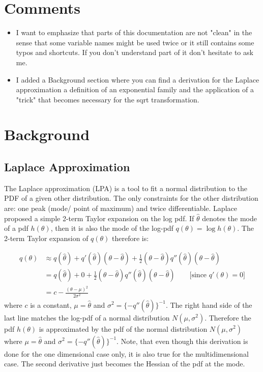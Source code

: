 \documentclass{article}
\author{%
  Marius Hobbhahn \\
  Department of Computer Science\\
  University of Tübingen\\
  Tübingen, Germany \\
  \texttt{marius.hobbhahn@gmail.com} \\
}
\begin{document}
\section*{Comments}

\begin{itemize}
	\item I want to emphasize that parts of this documentation are not "clean" in the sense that some variable names might be used twice or it still contains some typos and shortcuts. If you don't understand part of it don't hesitate to ask me. 
	\item I added a Background section where you can find a derivation for the Laplace approximation a definition of an exponential family and the application of a "trick" that becomes necessary for the sqrt transformation.
\end{itemize}

\section*{Background}

\subsection{Laplace Approximation}

The Laplace approximation (LPA) is a tool to fit a normal distribution to the PDF of a given other distribution. The only constraints for the other distribution are: one peak (mode/ point of maximum) and twice differentiable. Laplace proposed a simple 2-term Taylor expansion on the log pdf. If $\hat{\theta}$ denotes the mode of a pdf $h(\theta)$, then it is also the mode of the log-pdf $q(\theta) = \log h(\theta)$. The 2-term Taylor expansion of $q(\theta)$ therefore is:

\begin{align}
q(\theta) &\approx q(\hat{\theta}) + q'(\hat{\theta})(\theta - \hat{\theta}) + \frac{1}{2}(\theta- \hat{\theta})q''(\hat{\theta}) (\theta - \hat{\theta})\\
&= 	q(\hat{\theta}) + 0 +  \frac{1}{2}(\theta- \hat{\theta})q''(\hat{\theta}) (\theta - \hat{\theta}) \qquad \text{[since } q'(\theta) = 0]\\
&= c - \frac{(\theta - \mu)^2}{2\sigma^2}
\end{align}
where $c$ is a constant, $\mu = \hat{\theta}$ and $\sigma^2 = \{-q''(\hat{\theta})\}^{-1}$. The right hand side of the last line matches the log-pdf of a normal distribution $N(\mu, \sigma^2)$. Therefore the pdf $h(\theta)$ is approximated by the pdf of the normal distribution $N(\mu, \sigma^2)$ where $\mu = \hat{\theta}$ and $\sigma^2 = \{-q''(\hat{\theta})\}^{-1}$. Note, that even though this derivation is done for the one dimensional case only, it is also true for the multidimensional case. The second derivative just becomes the Hessian of the pdf at the mode.
\end{document}
